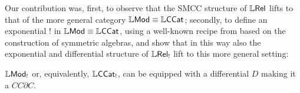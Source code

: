 \documentclass[submission,%
]{eptcs}
\begin{document}




Our contribution was, first, to observe that the SMCC structure of $\mathbb{L} \mathsf{Rel}$ lifts to that of the more general category $\mathbb{L}\mathsf{Mod}\equiv\mathbb{L}\mathsf{CCat}$; secondly, to define an exponential $!$ in $\mathbb{L}\mathsf{Mod}\equiv\mathbb{L}\mathsf{CCat}$, using a well-known recipe from \cite{Mellies2018, Manzo2013} based on the construction of symmetric algebras, and show that in this way also the exponential and differential structure of $\mathbb{L} \mathsf{Rel}_{!}$ lift to this more general setting:
%
\begin{theorem}\label{thm:no-base}
$\mathbb{L}\mathsf{Mod}_{!}$ or, equivalently, $\mathbb{L}\mathsf{CCat}_{!}$, can be equipped with a differential $D$ making it a $CC\partial C$.
\end{theorem}
\end{document}
